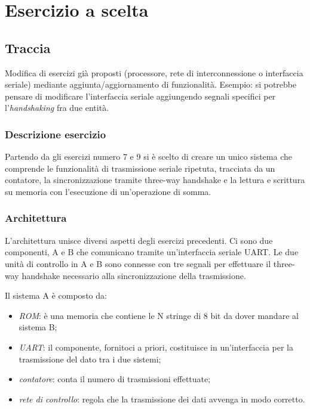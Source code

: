 \chapter{Esercizio a scelta}
\section{Traccia}

 Modifica di esercizi già proposti (processore, rete di interconnessione o interfaccia seriale) mediante aggiunta/aggiornamento di funzionalità. 
Esempio: si potrebbe pensare di modificare l’interfaccia seriale aggiungendo segnali specifici per l’\textit{handshaking} fra due entità. 

\subsection{Descrizione esercizio}
Partendo da gli esercizi numero 7 e 9 si è scelto di creare un unico sistema che comprende le funzionalità di trasmissione seriale ripetuta, tracciata da un contatore, la sincronizzazione tramite three-way handshake e la lettura e scrittura su memoria con l'esecuzione di un'operazione di somma.


\subsection{Architettura}
L'architettura unisce diversi aspetti degli esercizi precedenti. Ci sono due componenti, A e B che comunicano tramite un'interfaccia seriale UART. Le due unità di controllo in A e B sono connesse con tre segnali per effettuare il three-way handshake necessario alla sincronizzazione della trasmissione.

Il sistema A è composto da:
\begin{itemize}
    \item \textit{ROM}: è una memoria che contiene le N stringe di 8 bit da dover mandare al sistema B;
    \item \textit{UART}: il componente, fornitoci a priori, costituisce in un'interfaccia per la trasmissione del dato tra i due sistemi;
    \item \textit{contatore}: conta il numero di trasmissioni effettuate;
    \item \textit{rete di controllo}: regola che la trasmissione dei dati avvenga in modo corretto.
\end{itemize}

